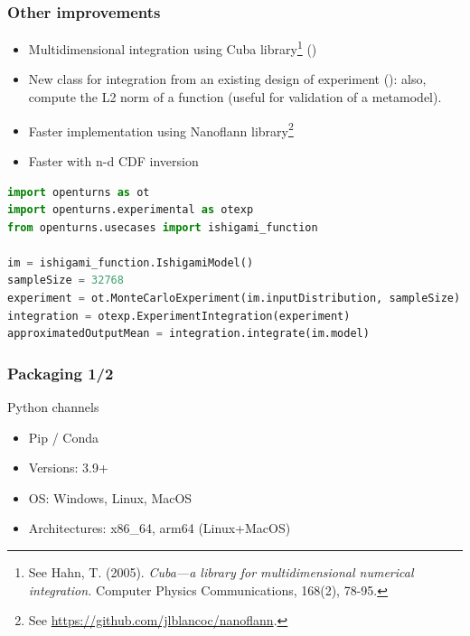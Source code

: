 \documentclass[aspectratio=169]{beamer}
\begin{document}

\begin{frame}[fragile]
\frametitle{Other improvements}
\begin{itemize}
\item Multidimensional integration using Cuba library\footnote{See 
Hahn, T. (2005). \emph{Cuba—a library for multidimensional numerical integration.} 
Computer Physics Communications, 168(2), 78-95.} ()
\item New class for integration from an existing design of experiment 
(): also, compute the L2 norm of a function 
(useful for validation of a metamodel).
\item Faster  implementation using Nanoflann library\footnote{See 
\url{https://github.com/jlblancoc/nanoflann}.}
\item Faster  with n-d CDF inversion
\end{itemize}

\vspace{6pt}


\begin{lstlisting}[language=Python]
import openturns as ot
import openturns.experimental as otexp
from openturns.usecases import ishigami_function

im = ishigami_function.IshigamiModel()
sampleSize = 32768
experiment = ot.MonteCarloExperiment(im.inputDistribution, sampleSize)
integration = otexp.ExperimentIntegration(experiment)
approximatedOutputMean = integration.integrate(im.model)
\end{lstlisting}

\end{frame}


\begin{frame}
\frametitle{Packaging 1/2}
\begin{block}{Python channels}
\begin{itemize}
\item Pip / Conda
\item Versions: 3.9+
\item OS: Windows, Linux, MacOS
\item Architectures: x86\_64, arm64 (Linux+MacOS)
\end{itemize}
\end{block}


\end{frame}
\end{document}
